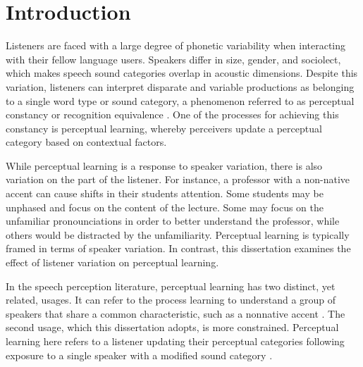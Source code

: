 
\chapter{Introduction}
\label{chap:intro}

Listeners are faced with a large degree of phonetic variability when interacting with their fellow language users.  
Speakers differ in size, gender, and sociolect, which makes speech sound categories overlap in acoustic dimensions.
Despite this variation, listeners can interpret disparate and variable productions as belonging to a single word type or sound category, a phenomenon referred to as perceptual constancy \citep{Shankweiler1977, Kuhl1979} or recognition equivalence \citep{Sumner2013}.
One of the processes for achieving this constancy is perceptual learning, whereby perceivers update a perceptual category based on contextual factors.

While perceptual learning is a response to speaker variation, there is also variation on the part of the listener.
For instance, a professor with a non-native accent can cause shifts in their students attention.
Some students may be unphased and focus on the content of the lecture.
Some may focus on the unfamiliar pronounciations in order to better understand the professor, while others would be distracted by the unfamiliarity.
Perceptual learning is typically framed in terms of speaker variation.
In contrast, this dissertation examines the effect of listener variation on perceptual learning.

In the speech perception literature, perceptual learning has two distinct, yet related, usages.
It can refer to the process learning to understand a group of speakers that share a common characteristic, such as a nonnative accent \citep{Bradlow2008}.
The second usage, which this dissertation adopts, is more constrained.
Perceptual learning here refers to a listener updating their perceptual categories following exposure to a single speaker with a modified sound category \citep{Norris2003}.


